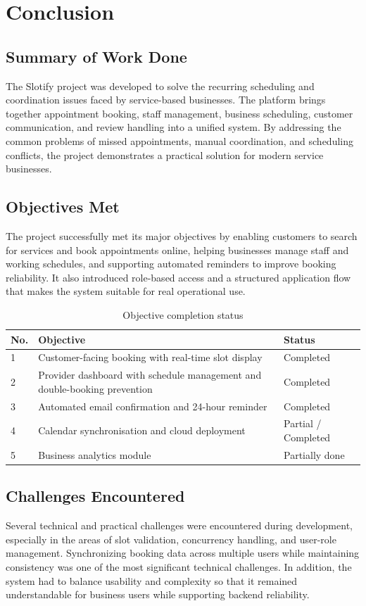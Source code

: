 \chapter{Conclusion}

\section{Summary of Work Done}
The Slotify project was developed to solve the recurring scheduling and coordination issues faced by service-based businesses. The platform brings together appointment booking, staff management, business scheduling, customer communication, and review handling into a unified system. By addressing the common problems of missed appointments, manual coordination, and scheduling conflicts, the project demonstrates a practical solution for modern service businesses.

\section{Objectives Met}
The project successfully met its major objectives by enabling customers to search for services and book appointments online, helping businesses manage staff and working schedules, and supporting automated reminders to improve booking reliability. It also introduced role-based access and a structured application flow that makes the system suitable for real operational use.

\begin{table}[h]
\centering
\caption{Objective completion status}
\begin{tabular}{|p{1cm}|p{8cm}|p{3cm}|}
\hline
\textbf{No.} & \textbf{Objective} & \textbf{Status} \\
\hline
1 & Customer-facing booking with real-time slot display & Completed \\
\hline
2 & Provider dashboard with schedule management and double-booking prevention & Completed \\
\hline
3 & Automated email confirmation and 24-hour reminder & Completed \\
\hline
4 & Calendar synchronisation and cloud deployment & Partial / Completed \\
\hline
5 & Business analytics module & Partially done \\
\hline
\end{tabular}
\end{table}

\section{Challenges Encountered}
Several technical and practical challenges were encountered during development, especially in the areas of slot validation, concurrency handling, and user-role management. Synchronizing booking data across multiple users while maintaining consistency was one of the most significant technical challenges. In addition, the system had to balance usability and complexity so that it remained understandable for business users while supporting backend reliability.

